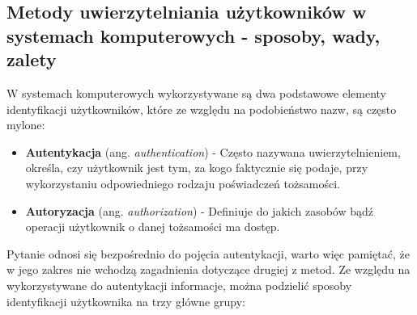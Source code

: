 \subsection{Metody uwierzytelniania użytkowników w systemach komputerowych - sposoby, wady, zalety}

W systemach komputerowych wykorzystywane są dwa podstawowe elementy identyfikacji użytkowników, które ze względu na podobieństwo nazw, są często mylone:

\begin{itemize}
	\item \textbf{Autentykacja} (ang. \textit{authentication}) - Często nazywana uwierzytelnieniem, określa, czy użytkownik jest tym, za kogo faktycznie się podaje, przy wykorzystaniu odpowiedniego rodzaju
	poświadczeń tożsamości.

	\item \textbf{Autoryzacja} (ang. \textit{authorization}) - Definiuje do jakich zasobów bądź operacji użytkownik o
	danej tożsamości ma dostęp.
\end{itemize}

Pytanie odnosi się bezpośrednio do pojęcia autentykacji, warto więc pamiętać, że w jego zakres nie wchodzą zagadnienia dotyczące drugiej z metod. Ze względu na wykorzystywane do autentykacji informacje, można podzielić sposoby identyfikacji użytkownika na trzy główne grupy:


